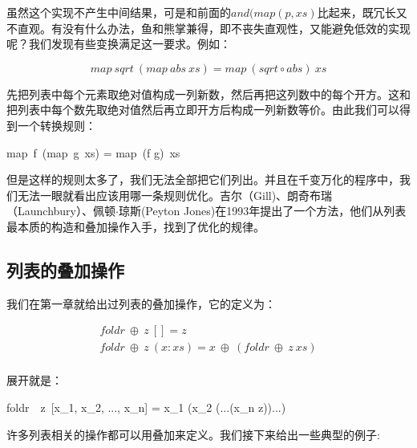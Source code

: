 \documentclass[b5paper]{ctexart}
\begin{document}
虽然这个实现不产生中间结果，可是和前面的$and(map(p, xs)$比起来，既冗长又不直观。有没有什么办法，鱼和熊掌兼得，即不丧失直观性，又能避免低效的实现呢？我们发现有些变换满足这一要求。例如：

\[
map\ sqrt\  (map\ abs\ xs) = map\ (sqrt \circ abs)\ xs
\]

先把列表中每个元素取绝对值构成一列新数，然后再把这列数中的每个开方。这和把列表中每个数先取绝对值然后再立即开方后构成一列新数等价。由此我们可以得到一个转换规则：

\be
map\ f\ (map\ g\ xs) = map\ (f \circ g)\ xs
\ee

但是这样的规则太多了，我们无法全部把它们列出。并且在千变万化的程序中，我们无法一眼就看出应该用哪一条规则优化。吉尔（Gill)、朗奇布瑞（Launchbury）、佩顿$\cdot$琼斯(Peyton Jones)在1993年提出了一个方法，他们从列表最本质的构造和叠加操作入手，找到了优化的规律。

\subsection{列表的叠加操作}

我们在第一章就给出过列表的叠加操作，它的定义为：

\[
\begin{array}{l}
foldr\ \oplus\ z\ [] = z \\
foldr\ \oplus\ z\ (x:xs) = x\ \oplus\ (foldr\ \oplus\ z\ xs) \\
\end{array}
\]

展开就是：

\be
foldr\ \oplus\ z\ [x_1, x_2, ..., x_n] = x_1 \oplus (x_2 \oplus (...(x_n \oplus z))...)
\ee

许多列表相关的操作都可以用叠加来定义。我们接下来给出一些典型的例子:
\end{document}
